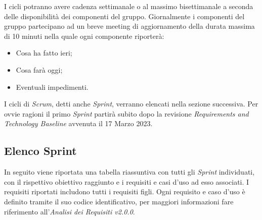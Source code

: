I cicli potranno avere cadenza settimanale o al massimo bisettimanale a seconda delle disponibilità dei componenti del gruppo. Giornalmente i componenti del gruppo partecipano ad un breve meeting di aggiornamento della durata massima di 10 minuti nella quale ogni componente riporterà:
\begin{itemize}
    \item Cosa ha fatto ieri;
    \item Cosa farà oggi;
    \item Eventuali impedimenti.
\end{itemize}
I cicli di \textit{Scrum}, detti anche \textit{Sprint}, verranno elencati nella sezione successiva.
Per ovvie ragioni il primo \textit{Sprint} partirà subito dopo la revisione \textit{Requirements and Technology Baseline} avvenuta il 17 Marzo 2023.

\subsection{Elenco Sprint}
In seguito viene riportata una tabella riassuntiva con tutti gli \textit{Sprint} individuati, con il rispettivo obiettivo raggiunto e i requisiti e casi d'uso ad esso associati. I requisiti riportati includono tutti i requisiti figli.
Ogni requisito e caso d'uso è definito tramite il suo codice identificativo, per maggiori informazioni fare riferimento all'\textit{Analisi dei Requisiti v2.0.0}.

\renewcommand{\arraystretch}{1.8}

